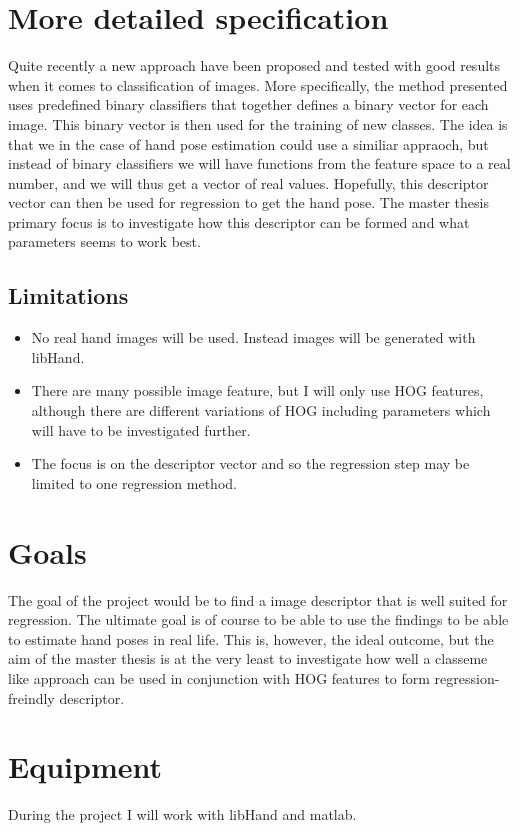 \documentclass[12pt]{article}
\begin{document}
\section*{More detailed specification}
Quite recently a new approach have been proposed and tested with good results when it comes to classification of images.
More specifically, the method presented uses predefined binary classifiers that together defines a binary vector for each image.
This binary vector is then used for the training of new classes.
The idea is that we in the case of hand pose estimation could use a similiar appraoch, but instead of binary classifiers we will have functions from the feature space to a real number, and we will thus get a vector of real values. 
Hopefully, this descriptor vector can then be used for regression to get the hand pose.
The master thesis primary focus is to investigate how this descriptor can be formed and what parameters seems to work best.

\subsection*{Limitations}
\begin{itemize}
\item
No real hand images will be used. Instead images will be generated with libHand.
\item
There are many possible image feature, but I will only use HOG features, although there are different variations of HOG including parameters which will have to be investigated further.
\item
The focus is on the descriptor vector and so the regression step may be limited to one regression method.
\end{itemize}

\section*{Goals}
The goal of the project would be to find a image descriptor that is well suited for regression.
The ultimate goal is of course to be able to use the findings to be able to estimate hand poses in real life.
This is, however, the ideal outcome, but the aim of the master thesis is at the very least to investigate how well a classeme like approach can be used in conjunction with HOG features to form regression-freindly descriptor.

\section*{Equipment}
During the project I will work with libHand and matlab.
\end{document}
